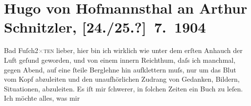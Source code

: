 

         
         \newcommand{\erwaehntePersonen}{Personen: Pedro Calderón de la Barca,  Euripides, Johann Wolfgang von Goethe, Hugo August von Hofmannsthal, Friedrich von Schiller}
         \newcommand{\erwaehnteInstitutionen}{Institutionen: S. Fischer Verlag}
         \newcommand{\erwaehnteOrte}{Orte: Bad Fusch, Ramgut, Wien}
         \newcommand{\erwaehnteWerke}{Werke: Briefwechsel zwischen Schiller und Goethe, Das gerettete Venedig. Trauerspiel in fünf Aufzügen, Der Turm. Ein Trauerspiel, Die Bakchen, Elektra. Tragödie in einem Aufzug, Linzer Tages-Post, Orest in Delphi, Pentheus. Trauerspiel in zwei Aufzügen}
               \section[Hugo von Hofmannsthal an Arthur Schnitzler, {[}24./25.?{]} 7. 1904]{ Hugo von Hofmannsthal an Arthur Schnitzler, {[}24./25.?{]} 7. 1904}\nopagebreak{}\rehead{ }\begin{ledgroupsized}[t]{13cm}\normalsize\beginnumbering \toendnotes[C]{\smallbreak\pagebreak[2]} 
\toendnotes[C]{\smallbreak}\pstart
           \raggedleft{}{\pb}Bad Fuſch2\textcolor{gray}{×}\textsc{ten}\pend
           \pstart{}lieber, \pend\pstart
           hier bin ich wirklich wie unter dem erſten Anhauch der Luft geſund geworden, und von
               einem innern Reichthum, daſs ich manchmal, gegen Abend, auf eine ſteile Berglehne hin
               aufklettern muſs, nur um das Blut vom Kopf abzuleiten und den unaufhörlichen {\pb}Zudrang von Gedanken, Bildern,
               Situationen, abzuleiten.\pend
           \pstart
           Es iſt mir ſchwerer, in ſolchen Zeiten ein Buch zu leſen. Ich möchte alles, was mir

\end{ledgroupsized}
